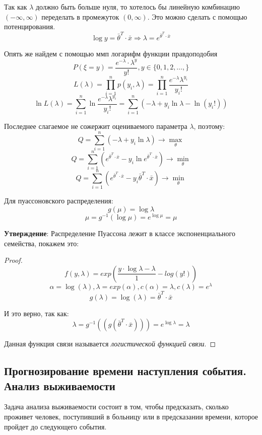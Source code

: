 \documentclass[aps,%
12pt,%
final,%
oneside,
onecolumn,%
musixtex, %
superscriptaddress,%
centertags]{article} %
\theoremstyle{plain}
\theoremstyle{definition}
\theoremstyle{remark}
\begin{document}
Так как $\lambda $ должно быть больше нуля, то хотелось бы линейную комбинацию $(-\infty, \infty)$ переделать в промежуток $(0,\infty)$. Это можно сделать с помощью потенцирования.
$$\log y =  \left .\bar{\theta}\right .^T \cdot \bar{x} \Rightarrow \lambda = e^{\left .\bar{\theta}\right .^T \cdot \bar{x}}$$

Опять же найдем с помощью ммп логарифм функции правдоподобия
$$P(\xi = y)  = \frac{e^{-\lambda}\cdot \lambda^y}{y!}, y \in \{0,1,2,\ldots, \} $$
$$L(\lambda) = \prod\limits_{i=1}^n p(y_i,\lambda) = \prod\limits_{i=1}^n \frac{e^{-\lambda} \lambda^{y_i}}{y_i !}$$
$$\ln L(\lambda) = \sum\limits_{i=1}^n \ln \frac{e^{-\lambda} \lambda^{y_i}}{y_i !} =\sum\limits_{i=1}^n (-\lambda + y_i \ln \lambda - \ln(y_i !))$$

Последнее слагаемое не сожержит оцениваемого параметра $\lambda$, поэтому:
$$Q =\sum\limits_{i=1}^n (-\lambda + y_i \ln \lambda ) \to \underset{\theta}{\max}$$
$$Q = \sum\limits_{i=1}^n ( e^{\left .\bar{\theta}\right .^T \cdot \bar{x}}  - y_i \ln  e^{\left .\bar{\theta}\right .^T \cdot \bar{x}} ) \to \underset{\theta}{\min}$$
$$Q = \sum\limits_{i=1}^n ( e^{\left .\bar{\theta}\right .^T \cdot \bar{x}}  - y_i \bar{\theta}^T \cdot \bar{x} )\to \underset{\theta}{\min}$$

Для пуассоновского распределения:
$$g(\mu) = \log \lambda$$
$$\mu = g^{-1}(\log \mu) = e^{\log \mu} = \mu$$

\textbf{Утверждение}: Распределение Пуассона лежит в классе экспоненциального семейства, покажем это:
\begin{proof}
	$$f(y,\lambda) = exp\left(\frac{y\cdot\log\lambda - \lambda}{1} - log(y!)\right)$$
	$$\alpha = \log(\lambda), \lambda = exp(\alpha), c(\alpha) = \lambda, c(\lambda) = e^{\lambda}$$
	$$g(\lambda) = \log(\lambda) = \left .\bar{\theta}\right .^T \cdot \bar{x}$$

	И это верно, так как:
	$$\lambda = g^{-1}((g(\left .\bar{\theta}\right .^T \cdot \bar{x}))) = e^{\log \lambda} = \lambda$$

	Данная функция связи называется \textit{логистической функцией связи}.
\end{proof}

\newpage
\subsection{Прогнозирование времени наступления события. Анализ выживаемости}

Задача анализа выживаемости состоит в том, чтобы предсказать, сколько проживет человек, поступивший в больницу или в предсказании времени, которое пройдет до следующего события.
\end{document}

